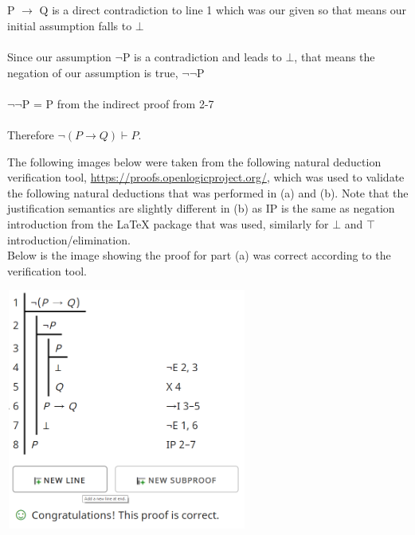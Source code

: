 \documentclass{article}
\begin{document}
\begin{enumerate}[(a)]
        \\\\P $\to$ Q is a direct contradiction to line 1 which was our given so that means our initial assumption falls to $\bot$
        \\\\Since our assumption $\neg$P is a contradiction and leads to $\bot$, that means the negation of our assumption is true, $\neg\neg$P
        \\\\$\neg\neg$P = P from the indirect proof from 2-7
        \\\\Therefore $\neg(P \to Q)\vdash P$.
    \end{enumerate}
\newpage
\begin{flushleft}
The following images below were taken from the following natural deduction verification tool,  \href{https://proofs.openlogicproject.org/}{https://proofs.openlogicproject.org/}, which was used to validate the following natural deductions that was performed in (a) and (b). Note that the justification semantics are slightly different in (b) as IP is the same as negation introduction from the LaTeX package that was used, similarly for $\bot$ and $\top$ introduction/elimination. \\Below is the image showing the proof for part (a) was correct according to the verification tool.\\
\end{flushleft}
\begin{centering}\hspace*{1pt}\includegraphics[width=300px, height = 300px]{3a.png}\end{centering}
\end{document}
